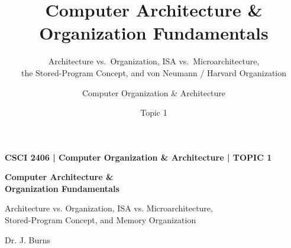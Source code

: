 \documentclass[aspectratio=169,11pt,t]{beamer}
\title[Topic 1]{
  Computer Architecture \& Organization Fundamentals
}
\subtitle{
  Architecture vs.\ Organization,
  ISA vs.\ Microarchitecture,\\
  the Stored-Program Concept,
  and von Neumann / Harvard Organization
}
\author{
  Computer Organization \& Architecture
}
\date{Topic 1}
\begin{document}

\begin{frame}[plain]

\vspace*{\fill}

\begin{minipage}{0.88\textwidth}
{\color{gold}\normalsize\bfseries
CSCI 2406 \;|\; Computer Organization \& Architecture \;|\; TOPIC 1
\par}

\vspace{0.25cm}

{\color{white}\fontsize{24}{28}\selectfont\bfseries
Computer Architecture \& \\ Organization
Fundamentals
\par}

\vspace{0.35cm}

{\color{white!80}\large
Architecture vs. Organization, ISA vs. Microarchitecture,\\
Stored-Program Concept, and Memory Organization
\par}
\end{minipage}

\vfill

{\color{white!70}\small
Dr. J. Burns
\par}

\vspace*{\fill}
\end{frame}


\end{document}

